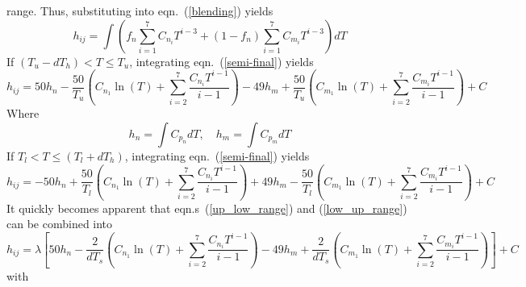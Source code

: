 \documentclass{article}   	%
\begin{document}
range. Thus, substituting into eqn.~(\ref{blending}) yields
\begin{equation}
  h_{ij} = \int \left(f_n \sum_{i=1}^{7} C_{n_i} T^{i-3} + (1 - f_n) \sum_{i=1}^{7} C_{m_i} T^{i-3}\right) dT
  \label{semi-final}
\end{equation}
If $(T_u - dT_h) < T \leq T_u$, integrating eqn.~(\ref{semi-final}) yields
\begin{equation}
  h_{ij} = 50 h_n - \frac{50}{T_u}\left(C_{n_1}\ln(T) + \sum_{i=2}^{7} \frac{C_{n_i} T^{i-1}}{i-1} \right)
  -49 h_m + \frac{50}{T_u}\left(C_{m_1}\ln(T) + \sum_{i=2}^{7} \frac{C_{m_i} T^{i-1}}{i-1} \right) + C
  \label{up_low_range}
\end{equation}
Where
\begin{equation}
  h_n = \int C_{p_n} dT, \quad h_m = \int C_{p_m} dT
\end{equation}
If $T_l < T \leq (T_l + dT_h)$, integrating eqn.~(\ref{semi-final}) yields
\begin{equation}
  h_{ij} = -50 h_n + \frac{50}{T_l}\left(C_{n_1}\ln(T) + \sum_{i=2}^{7} \frac{C_{n_i} T^{i-1}}{i-1} \right)
  +49 h_m - \frac{50}{T_l}\left(C_{m_1}\ln(T) + \sum_{i=2}^{7} \frac{C_{m_i} T^{i-1}}{i-1} \right) + C
  \label{low_up_range}
\end{equation}
It quickly becomes apparent that eqn.s~(\ref{up_low_range}) and
(\ref{low_up_range}) can be combined into
\begin{equation}
  h_{ij} = \lambda\left[50 h_n - \frac{2}{dT_s}\left(C_{n_1}\ln(T) + \sum_{i=2}^{7} \frac{C_{n_i} T^{i-1}}{i-1} \right)
  -49 h_m + \frac{2}{dT_s}\left(C_{m_1}\ln(T) + \sum_{i=2}^{7} \frac{C_{m_i} T^{i-1}}{i-1} \right)\right] + C
  \label{final_w_const}
\end{equation}
with
\end{document}
